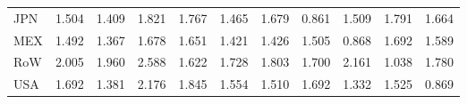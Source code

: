 \begin{table}[htbp]
\begin{tabular}{lcccccccccc}
  JPN & \textcolor[RGB]{176,114,79}{1.504} & \textcolor[RGB]{209,135,46}{1.409} & \textcolor[RGB]{48,31,207}{1.821} & \textcolor[RGB]{66,43,189}{1.767} & \textcolor[RGB]{189,122,66}{1.465} & \textcolor[RGB]{112,73,143}{1.679} & \textcolor[RGB]{247,160,8}{0.861} & \textcolor[RGB]{171,111,84}{1.509} & \textcolor[RGB]{56,36,199}{1.791} & \textcolor[RGB]{122,79,133}{1.664} \\ 
  MEX & \textcolor[RGB]{184,119,71}{1.492} & \textcolor[RGB]{217,140,38}{1.367} & \textcolor[RGB]{115,74,140}{1.678} & \textcolor[RGB]{128,82,128}{1.651} & \textcolor[RGB]{204,132,51}{1.421} & \textcolor[RGB]{201,130,54}{1.426} & \textcolor[RGB]{173,112,82}{1.505} & \textcolor[RGB]{242,157,13}{0.868} & \textcolor[RGB]{99,64,156}{1.692} & \textcolor[RGB]{143,92,112}{1.589} \\ 
  RoW & \textcolor[RGB]{20,13,235}{2.005} & \textcolor[RGB]{25,16,230}{1.960} & \textcolor[RGB]{3,2,252}{2.588} & \textcolor[RGB]{133,86,122}{1.622} & \textcolor[RGB]{82,53,173}{1.728} & \textcolor[RGB]{54,35,201}{1.803} & \textcolor[RGB]{94,61,161}{1.700} & \textcolor[RGB]{10,7,245}{2.161} & \textcolor[RGB]{230,148,26}{1.038} & \textcolor[RGB]{61,40,194}{1.780} \\ 
  USA & \textcolor[RGB]{102,66,153}{1.692} & \textcolor[RGB]{214,139,41}{1.381} & \textcolor[RGB]{8,5,247}{2.176} & \textcolor[RGB]{46,30,209}{1.845} & \textcolor[RGB]{156,101,99}{1.554} & \textcolor[RGB]{168,109,87}{1.510} & \textcolor[RGB]{97,63,158}{1.692} & \textcolor[RGB]{224,145,31}{1.332} & \textcolor[RGB]{158,102,97}{1.525} & \textcolor[RGB]{240,155,15}{0.869} \\ 
   \hline
\end{tabular}
\end{table}

